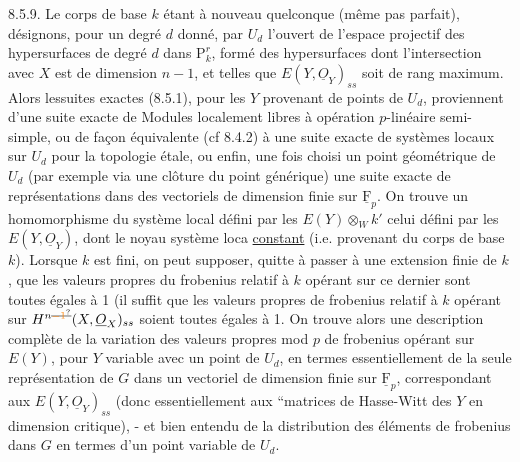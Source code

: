 8.5.9. Le corps de base $k$ étant à nouveau quelconque (même pas  parfait), désignons, pour un degré $d$ donné, par $U_d$ l'ouvert de l'espace projectif des hypersurfaces de degré $d$ dans $\mathrm P^r_k$, formé des hypersurfaces dont l'intersection avec $X$ est   de dimension $n-1$, et telles que $E(Y,\underline O_Y)_{ss}$ soit de rang maximum. Alors lessuites exactes (8.5.1), pour les $Y$ provenant de points de $U_d$, proviennent d'une suite exacte de Modules localement libres  à opération $p$-linéaire semi-simple, ou de façon équivalente (cf 8.4.2) à une suite exacte de systèmes locaux  sur $U_d$ pour la topologie étale,  ou enfin, une fois choisi un point géométrique de $U_d$ (par exemple via une clôture  du point générique) une suite exacte de représentations  dans des vectoriels de dimension finie sur $\underline{\mathrm F}_p$.  On trouve un homomorphisme \inserted{\handwritten{$\varphi$}} du système local défini par les $E(Y)\otimes_W k'$   celui défini par les $E(Y,\underline O_Y)$, dont le noyau   système loca \uline{constant} (i.e. provenant du corps de base $k$). Lorsque $k$ est fini, on peut supposer, quitte à passer à une extension finie de $k$, que les valeurs propres du frobenius relatif à $k$ opérant sur ce dernier  sont toutes égales à 1 (il suffit que les valeurs propres de frobenius relatif à $k$ opérant sur  $H^{n\deleted{\unsure{-1}}}(X,\underline O_X)_{ss}$  soient
%
toutes égales à 1\handwritten{)}. On trouve alors une description complète de la variation des valeurs propres mod $p$ de frobenius opérant sur $E(Y)$, pour $Y$ variable avec un point de $U_d$, en termes essentiellement de la seule représentation de $G$ dans un vectoriel de dimension finie sur $\underline{\mathrm F}_p$, correspondant aux $E(Y,\underline O_Y)_{ss}$ (donc essentiellement aux ``matrices de Hasse-Witt des $Y$ en dimension critique), - et bien entendu de la distribution des  éléments de frobenius dans $G$ en termes d'un point variable de $U_d$.

